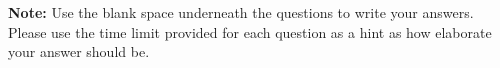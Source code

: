 \newif\ifloesung
\loesungtrue

\newif\ifenglisch
\englischtrue






\newcommand{\Code}{Code}



\thispagestyle{firstpagestyle}

\textbf{Note:} Use the blank space underneath the questions to write your answers. Please use the time limit provided for each question as a hint as how elaborate your answer should be.






